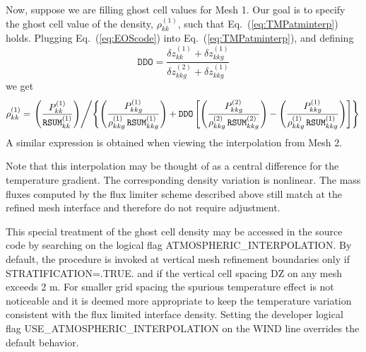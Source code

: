 Now, suppose we are filling ghost cell values for Mesh 1.  Our goal is to specify the ghost cell value of the density, $\rho^{(1)}_{kk}$, such that Eq.~(\ref{eq:TMPatminterp}) holds.  Plugging Eq.~(\ref{eq:EOScode}) into Eq.~(\ref{eq:TMPatminterp}), and defining
\begin{equation}
\label{eq:ddofactor}
\mathtt{DDO} = \frac{\delta z^{(1)}_{kk} + \delta z^{(1)}_{kkg}}{\delta z^{(2)}_{kkg} + \delta z^{(1)}_{kkg}}
\end{equation}
we get
\begin{equation}
\label{eq:atmrhoghost}
\rho^{(1)}_{kk} = \left. \left( \frac{P^{(1)}_{kk}}{\mathtt{RSUM}^{(1)}_{kk}} \right) \middle/ \left\{ \left(\frac{P^{(1)}_{kkg}}{\rho^{(1)}_{kkg}\,\mathtt{RSUM}^{(1)}_{kkg}}\right) + \mathtt{DDO}\left[ \left(\frac{P^{(2)}_{kkg}}{\rho^{(2)}_{kkg}\,\mathtt{RSUM}^{(2)}_{kkg}}\right) - \left(\frac{P^{(1)}_{kkg}}{\rho^{(1)}_{kkg}\,\mathtt{RSUM}^{(1)}_{kkg}}\right) \right] \right\} \right.
\end{equation}
A similar expression is obtained when viewing the interpolation from Mesh 2.

Note that this interpolation may be thought of as a central difference for the temperature gradient.  The corresponding density variation is nonlinear.  The mass fluxes computed by the flux limiter scheme described above still match at the refined mesh interface and therefore do not require adjustment.

This special treatment of the ghost cell density may be accessed in the source code by searching on the logical flag {\ct ATMOSPHERIC\_INTERPOLATION}.  By default, the procedure is invoked at vertical mesh refinement boundaries only if {\ct STRATIFICATION=.TRUE.} and if the vertical cell spacing {\ct DZ} on any mesh exceeds 2 m.  For smaller grid spacing the spurious temperature effect is not noticeable and it is deemed more appropriate to keep the temperature variation consistent with the flux limited interface density.  Setting the developer logical flag {\ct USE\_ATMOSPHERIC\_INTERPOLATION} on the {\ct WIND} line overrides the default behavior.

